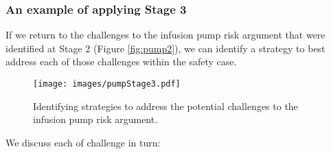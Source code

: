\subsubsection{An example of applying Stage 3}

If we return to the challenges to the infusion pump risk argument that were identified at Stage 2 (Figure \ref{fig:pump2}), we can identify a strategy to best address each of those challenges within the safety case.

\begin{figure*}
\texttt{[image: images/pumpStage3.pdf]}
\caption{Identifying strategies to address the potential challenges to the infusion pump risk argument.}
\label{fig:pump3}
\end{figure*}

We discuss each of challenge in turn:

